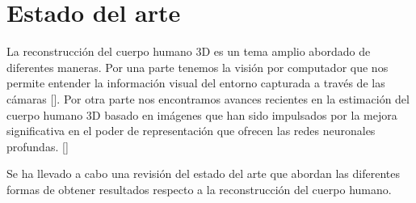 \section{Estado del arte}
La reconstrucción del cuerpo humano 3D es un tema amplio abordado de diferentes maneras. Por una parte tenemos la visión por computador que nos permite entender la información visual del entorno capturada a través de las cámaras [\cite{Zhang1}]. Por otra parte nos encontramos avances recientes en la estimación del cuerpo humano 3D basado en imágenes que han sido impulsados por la mejora significativa en el poder de representación que ofrecen las redes neuronales profundas. [\cite{pifuhd}]

Se ha llevado a cabo una revisión del estado del arte que abordan las diferentes formas de obtener resultados respecto a la reconstrucción del cuerpo humano.
\\


